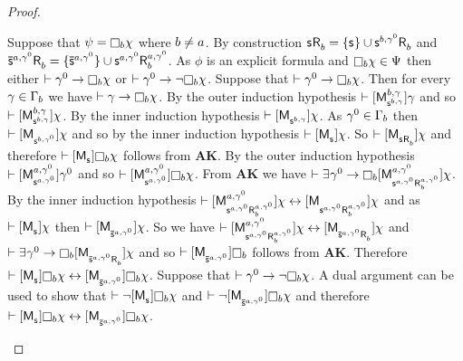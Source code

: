 \begin{proof}
\begin{enumerate}
        Suppose that $\psi = \necessaryB \chi$ where $\agentB \neq \agentA$. 
        By construction $\aStateS \aAccessibility{\agentB} = \{\aStateS\} \cup \aStateS[\agentB,\gamma^0] \aAccessibility{\agentB}$ and $\aPStateS[\agentA,\gamma^0] \aAccessibility{\agentB} = \{\aPStateS[\agentA,\gamma^0]\} \cup \aStateS[\agentA,\gamma^0] \aAccessibility[\agentA,\gamma^0]{\agentB}$.
        As $\phi$ is an explicit formula and $\necessaryB \chi \in \Psi$ then either $\proves \gamma^0 \implies \necessaryB \chi$ or $\proves \gamma^0 \implies \neg \necessaryB \chi$.
        Suppose that $\proves \gamma^0 \implies \necessaryB \chi$.
        Then for every $\gamma \in \Gamma_\agentB$ we have $\proves \gamma \implies \necessaryB \chi$.
        By the outer induction hypothesis $\proves \actionA{\aPModel[\agentB,\gamma]{\aStateS[\agentB,\gamma]}} \gamma$ and so $\proves \actionA{\aPModel[\agentB,\gamma]{\aStateS[\agentB,\gamma]}} \chi$.
        By the inner induction hypothesis $\proves \actionA{\aPModel{\aStateS[\agentB,\gamma]}} \chi$.
        As $\gamma^0 \in \Gamma_\agentB$ then $\proves \actionA{\aPModel{\aStateS[\agentB,\gamma^0]}} \chi$ and so by the inner induction hypothesis $\proves \actionA{\aPModel{\aStateS}} \chi$.
        So $\proves \actionA{\aPModel{\aStateS \aAccessibility{\agentB}}} \chi$ and therefore $\proves \actionA{\aPModel{\aStateS}} \necessaryB \chi$ follows from {\bf AK}.
        By the outer induction hypothesis $\proves \actionA{\aPModel[\agentA,\gamma^0]{\aStateS[\agentA,\gamma^0]}} \gamma^0$ and so $\proves \actionA{\aPModel[\agentA,\gamma^0]{\aStateS[\agentA,\gamma^0]}} \necessaryB \chi$.
        From {\bf AK} we have $\proves \somerefs{\gamma^0} \implies \necessaryB \actionA{\aPModel[\agentA,\gamma^0]{\aStateS[\agentA,\gamma^0] \aAccessibility[\agentA,\gamma^0]{\agentB}}} \chi$.
        By the inner induction hypothesis $\proves \actionA{\aPModel[\agentA,\gamma^0]{\aStateS[\agentA,\gamma^0] \aAccessibility[\agentA,\gamma^0]{\agentB}}} \chi \iff \actionA{\aPModel{\aStateS[\agentA,\gamma^0] \aAccessibility[\agentA,\gamma^0]{\agentB}}} \chi$ and as $\proves \actionA{\aPModel{\aStateS}} \chi$ then $\proves \actionA{\aPModel{\aPStateS[\agentA,\gamma^0]}} \chi$.
        So we have $\proves \actionA{\aPModel[\agentA,\gamma^0]{\aStateS[\agentA,\gamma^0] \aAccessibility[\agentA,\gamma^0]{\agentB}}} \chi \iff \actionA{\aPModel{\aPStateS[\agentA,\gamma^0] \aAccessibility{\agentB}}} \chi$ and $\proves \somerefs{\gamma^0} \implies \necessaryB \actionA{\aPModel{\aPStateS[\agentA,\gamma^0] \aAccessibility{\agentB}}} \chi$ and so $\proves \actionA{\aPModel{\aPStateS[\agentA,\gamma^0]}} \necessaryB$ follows from {\bf AK}.
        Therefore $\proves \actionA{\aPModel{\aStateS}} \necessaryB \chi \iff \actionA{\aPModel{\aPStateS[\agentA,\gamma^0]}} \necessaryB \chi$.
        Suppose that $\proves \gamma^0 \implies \neg \necessaryB \chi$.
        A dual argument can be used to show that $\proves \neg \actionA{\aPModel{\aStateS}} \necessaryB \chi$ and $\proves \neg \actionA{\aPModel{\aPStateS[\agentA,\gamma^0]}} \necessaryB \chi$ and therefore $\proves \actionA{\aPModel{\aStateS}} \necessaryB \chi \iff \actionA{\aPModel{\aPStateS[\agentA,\gamma^0]}} \necessaryB \chi$.


\end{enumerate}
\end{proof}
